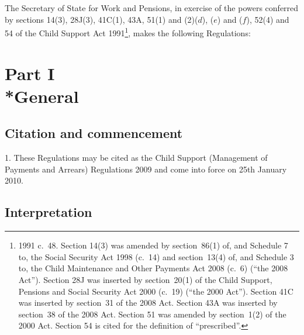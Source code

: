 \documentclass[12pt,a4paper]{article}
\title{\regstitle}
\author{S.I.\ 2009 No.\ 3151}
\date{Made
30th November 2009\\
Laid before Parliament
4th Deceember 2009\\
Coming into~force
25th January 2010
}
\begin{document}
\maketitle

\noindent
The Secretary of State for Work and Pensions, in exercise of the powers conferred by sections 14(3), 28J(3), 41C(1), 43A, 51(1) and (2)($d$), ($e$)  and ($f$), 52(4) and 54 of the Child Support Act 1991\footnote{1991 c.~48. Section 14(3) was amended by section~86(1) of, and Schedule 7 to, the Social Security Act 1998 (c.~14) and section~13(4) of, and Schedule 3 to, the Child Maintenance and Other Payments Act 2008 (c.~6) (“the 2008 Act”). Section 28J was inserted by section~20(1) of the Child Support, Pensions and Social Security Act 2000 (c.~19) (“the 2000 Act”). Section 41C was inserted by section~31 of the 2008 Act. Section 43A was inserted by section~38 of the 2008 Act. Section 51 was amended by section~1(2) of the 2000 Act. Section 54 is cited for the definition of “prescribed”.}, makes the following Regulations: 

{\sloppy

\tableofcontents

}

\bigskip

\setcounter{secnumdepth}{-2}

\section[Part I --- General]{Part I\\*General}

\renewcommand\parthead{--- Part I}

\subsection[1. Citation and commencement]{Citation and commencement}

1.  These Regulations may be cited as the Child Support (Management of Payments and Arrears) Regulations 2009 and come into force on 25th January 2010.

\subsection[2. Interpretation]{Interpretation}
\end{document}
